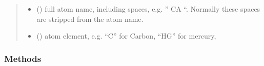 \documentclass[a4paper,10pt,english]{sphinxmanual}
\begin{document}
\begin{fulllineitems}
\begin{fulllineitems}
\begin{quote}
\begin{description}
\begin{itemize}
\item {} 
 () \textendash{} full atom name, including spaces, e.g. ” CA “. Normally
these spaces are stripped from the atom name.

\item {} 
 (\sphinxstyleliteralemphasis{\sphinxupquote{)}}) \textendash{} atom element, e.g. “C” for Carbon, “HG” for mercury,

\end{itemize}

\end{description}\end{quote}
\subsubsection*{Methods}


\begin{savenotes}\sphinxatlongtablestart\begin{longtable}{}
\hline

\endfirsthead

%
{}\\
\hline

\endhead

\hline
{}\\
\endfoot

\endlastfoot


\end{longtable}
\end{savenotes}
\end{fulllineitems}
\end{fulllineitems}
\end{document}
